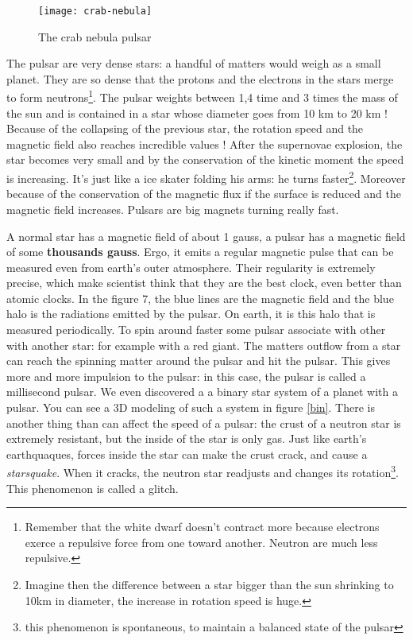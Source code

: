 \documentclass[a4paper, 11pt]{article} %
\begin{document}
\begin{figure}[h]
\centering
\texttt{[image: crab-nebula]}
\caption{The crab nebula pulsar}
\end{figure}

 The pulsar are very dense stars: a handful of matters would weigh as a small planet. They are so dense that the protons and the electrons in the stars merge to form neutrons\footnote{Remember that the white dwarf doesn't contract more because electrons exerce a repulsive force from one toward another. Neutron are much less repulsive.}. The pulsar weights between 1,4 time and 3 times the mass of the sun and is contained in a star whose diameter goes from 10 km to 20 km ! Because of the collapsing of the previous star, the rotation speed and the magnetic field also reaches incredible values ! 
After the supernovae explosion, the star becomes very small and by the conservation of the kinetic moment the speed is increasing. It's just like a ice skater folding his arms: he turns faster\footnote{Imagine then the difference between a star bigger than the sun shrinking to 10km in diameter, the increase in rotation speed is huge.}. Moreover because of the conservation of the magnetic flux if the surface is reduced and the magnetic field increases. Pulsars are big magnets turning really fast.

A normal star has a magnetic field of about 1 gauss, a pulsar has a magnetic field of some \textbf{thousands gauss}. Ergo, it emits a regular magnetic pulse that can be measured even from earth's outer atmosphere. Their regularity is extremely precise, which make scientist think that they are the best clock, even better than atomic clocks. In the figure 7, the blue lines are the magnetic field and the blue halo is the radiations emitted by the pulsar. On earth, it is this halo that is measured periodically. To spin around faster some pulsar associate with other with another star: for example with a red giant. The matters outflow from a star can reach the spinning matter around the pulsar and hit the pulsar. This gives more and more impulsion to the pulsar: in this case, the pulsar is called a millisecond pulsar. We even discovered a a binary star system of a planet with a pulsar. You can see a 3D modeling of such a system in figure \ref{bin}. There is another thing than can affect the speed of a pulsar: the crust of a neutron star is extremely resistant, but the inside of the star is only gas. Just like earth's earthquaques, forces inside the star can make the crust crack, and cause a \textit{starsquake}. When it cracks, the neutron star readjusts and changes its rotation\footnote{this phenomenon is spontaneous, to maintain a balanced state of the pulsar}. This phenomenon is called a glitch. 
\end{document}
